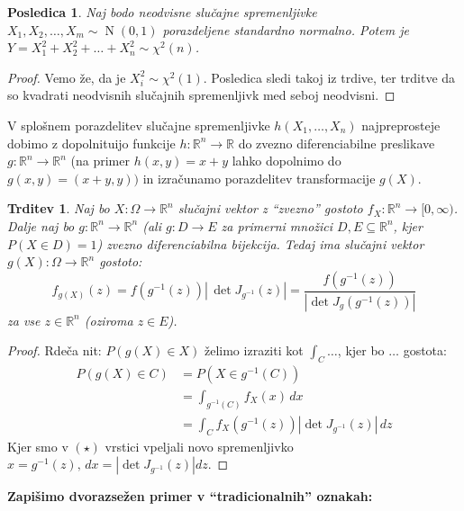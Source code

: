 \documentclass[12pt]{book}
\def\n{\noindent}
\theoremstyle{definition}
\theoremstyle{plain}
\theoremstyle{plain}
\newtheorem{trditev}{Trditev}
\theoremstyle{plain}
\theoremstyle{plain}
\newtheorem{posledica}{Posledica}
\theoremstyle{remark}
\begin{document}
\begin{posledica}
    Naj bodo neodvisne slučajne spremenljivke $X_1, X_2, \ldots, X_m \sim \operatorname{N}(0,1)$ porazdeljene standardno normalno. Potem je $Y=X_1^2+X_2^2+\ldots+X_n^2 \sim \chi^2(n)$.
\end{posledica}

\begin{proof}
    Vemo že, da je $X_i^2 \sim \chi^2(1)$. Posledica sledi takoj iz trdive, ter trditve da so kvadrati neodvisnih slučajnih spremenljivk med seboj neodvisni.
\end{proof}

\n V splošnem porazdelitev slučajne spremenljivke $h\left(X_1, \ldots, X_n\right)$ najpreprosteje dobimo z dopolnituijo funkcije $h: \mathbb{R}^n \rightarrow \mathbb{R}$ do zvezno diferenciabilne preslikave $g: \mathbb{R}^n \rightarrow \mathbb{R}^n$ (na primer $h(x, y)=x+y$ lahko dopolnimo do $g(x, y)=(x+y, y))$ in izračunamo porazdelitev transformacije $g(X)$.

\begin{trditev}
    Naj bo $X: \Omega \to \mathbb{R}^n$ slučajni vektor z “zvezno” gostoto $f_X:\mathbb{R}^n \to [0, \infty)$. Dalje naj bo $g: \mathbb{R}^n \to \mathbb{R}^n$ (ali $g:D \to E$ za primerni množici $D, E \subseteq \mathbb{R}^n$, kjer $P(X \in D)=1$) zvezno diferenciabilna bijekcija. Tedaj ima slučajni vektor $g(X): \Omega \to \mathbb{R}^n$ gostoto: 
    $$
    f_{g(X)}(z)=f\left(g^{-1}(z)\right) \left\lvert\, \det J_{g^{-1}}(z) \right\rvert =\frac{f\left(g^{-1}(z)\right)}{\left|\det J_g\left(g^{-1}(z)\right)\right|}
    $$
    za vse $z \in \mathbb{R}^n$ (oziroma $z \in E$).
\end{trditev}

\begin{proof}
    Rdeča nit: $P(g(X) \in X)$ želimo izraziti kot $\int_C \ldots$, kjer bo $\ldots$ gostota:
    \begin{align*}
        P(g(X) \in C)&=P\left(X \in g^{-1}(C)\right) \\
        &=\int_{g^{-1}(C)} f_X(x) \, d x \tag{$\star$}\\ 
        &=\int_C f_X\left(g^{-1}(z)\right)\left|\det J_{g^{-1}}(z)\right| \, d z    
    \end{align*} 
    Kjer smo v $(\star)$ vrstici vpeljali novo spremenljivko $x=g^{-1}(z), \, d x=| \det J_{g^{-1}}(z) | d z$.
\end{proof}

\n \textbf{Zapišimo dvorazsežen primer v “tradicionalnih” oznakah:}
\end{document}
